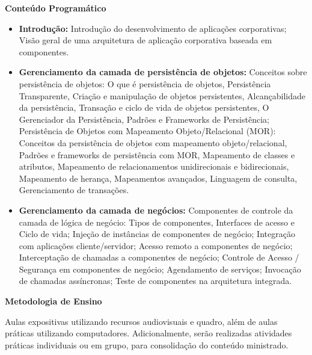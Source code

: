 
\begin{snugshade}\begin{center}\textbf{
    Conteúdo Programático
}\end{center}\end{snugshade}

\begin{itemize}

  \item \textbf{Introdução:} Introdução do desenvolvimento de aplicações corporativas;	Visão geral de uma arquitetura de aplicação corporativa baseada em componentes. 
  
  \item \textbf{Gerenciamento da camada de persistência de objetos:} Conceitos sobre persistência de objetos: O que é persistência de objetos, Persistência Transparente, Criação e manipulação de objetos persistentes, Alcançabilidade da persistência, Transação e ciclo de vida de objetos persistentes, O Gerenciador da Persistência, Padrões e Frameworks de Persistência; Persistência de Objetos com Mapeamento Objeto/Relacional (MOR): Conceitos da persistência de objetos com mapeamento objeto/relacional, Padrões e frameworks de persistência com MOR, Mapeamento de classes e atributos, Mapeamento de relacionamentos unidirecionais e bidirecionais, Mapeamento de herança, Mapeamentos avançados, Linguagem de consulta, Gerenciamento de transações.
 
 
  \item \textbf{Gerenciamento da camada de negócios:} Componentes de controle da camada de lógica de negócio: Tipos de componentes, Interfaces de acesso e Ciclo de vida; Injeção de instâncias de componentes de negócio; Integração com aplicações cliente/servidor; Acesso remoto a componentes de negócio; Interceptação de chamadas a componentes de negócio; Controle de Acesso / Segurança em componentes de negócio; Agendamento de serviços; Invocação de chamadas assíncronas; Teste de componentes na arquitetura integrada.

\end{itemize}

\begin{snugshade}\begin{center}\textbf{
    Metodologia de Ensino
}\end{center}\end{snugshade} 

\noindent
   Aulas expositivas utilizando recursos audiovisuais e quadro, além de aulas práticas utilizando computadores. Adicionalmente, serão realizadas atividades práticas individuais ou em grupo, para consolidação do conteúdo ministrado.

